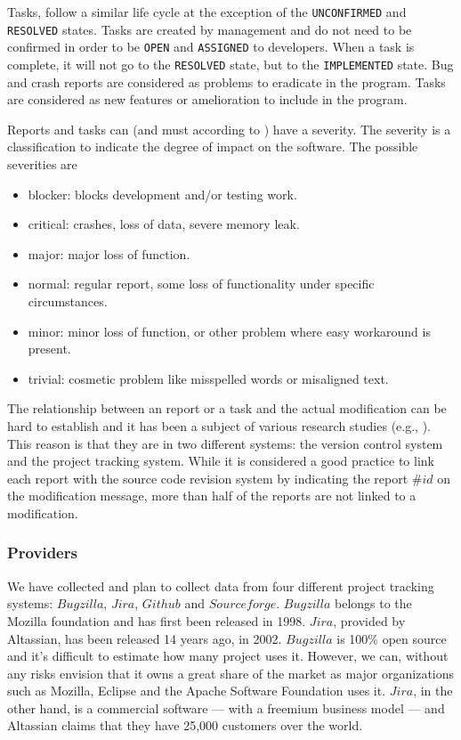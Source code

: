 Tasks, follow a similar life cycle at the exception of the {\tt UNCONFIRMED} and {\tt RESOLVED} states.
Tasks are created by management and do not need to be confirmed in order to be {\tt OPEN} and {\tt ASSIGNED} to developers.
When a task is complete, it will not go to the {\tt RESOLVED} state, but to the {\tt IMPLEMENTED} state.
Bug and crash reports are considered as problems to eradicate in the program.
Tasks are considered as new features or amelioration to include in the program.

Reports and tasks can (and must according to \cite{Bettenburg2008}) have a severity.
The severity is a classification to indicate the degree of  impact on the software.
The possible severities are

\begin{itemize}
	\item blocker: blocks development and/or testing work.
	\item critical: crashes, loss of data, severe memory leak.
	\item major: major loss of function.
	\item normal: regular report, some loss of functionality under
 specific circumstances.
  \item minor: minor loss of function, or other problem where easy workaround is present.
	\item trivial: cosmetic problem like misspelled words or misaligned text.
\end{itemize}

The relationship between an report or a task and the actual modification can be hard to establish and it has been a subject of various research studies (e.g., \cite{Antoniol2002,Bachmann2010,Wu2011}).
This reason is that they are in two different systems: the version control system and the project tracking system.
While it is considered a good practice to link each report with the source code revision system by indicating the report $\#id$ on the modification message, more than half of the reports are not linked to a modification\cite{Wu2011}.

\subsubsection{Providers\label{sec:bug-provider}}

We have collected and plan to collect data from four different project tracking systems: $Bugzilla$, $Jira$, $Github$ and $Sourceforge$.
 $Bugzilla$ belongs to the Mozilla foundation and has first been released in 1998.
 $Jira$, provided by Altassian, has been released 14 years ago, in 2002.
 $Bugzilla$ is 100\% open source and it's difficult to estimate how many project uses it.
 However, we can, without any risks envision that it owns a great share of the market as major organizations such as Mozilla, Eclipse and the Apache Software Foundation uses it.
 $Jira$, in the other hand, is a commercial software --- with a freemium business model --- and Altassian claims that they have 25,000 customers over the world.


